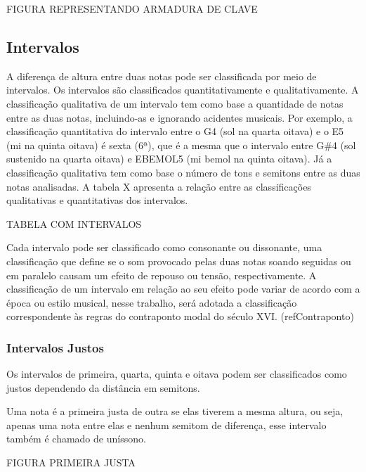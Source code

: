       FIGURA REPRESENTANDO ARMADURA DE CLAVE

    \subsection[Intervalos]{Intervalos}

      A diferença de altura entre duas notas pode ser classificada por meio de intervalos. Os intervalos são classificados quantitativamente e qualitativamente. A classificação qualitativa de um intervalo tem como base a quantidade de notas entre as duas notas, incluindo-as e ignorando acidentes musicais. Por exemplo, a classificação quantitativa do intervalo entre o G4 (sol na quarta oitava) e o E5 (mi na quinta oitava) é sexta (6ª), que é a mesma que o intervalo entre G\#4 (sol sustenido na quarta oitava) e EBEMOL5 (mi bemol na quinta oitava). Já a classificação qualitativa tem como base o número de tons e semitons entre as duas notas analisadas. A tabela X apresenta a relação entre as classificações qualitativas e quantitativas dos intervalos.

      TABELA COM INTERVALOS

      Cada intervalo pode ser classificado como consonante ou dissonante, uma classificação que define se o som provocado pelas duas notas soando seguidas ou em paralelo causam um efeito de repouso ou tensão, respectivamente. A classificação de um intervalo em relação ao seu efeito pode variar de acordo com a época ou estilo musical, nesse trabalho, será adotada a classificação correspondente às regras do contraponto modal do século XVI. (refContraponto)

      \subsubsection[Intervalos Justos]{Intervalos Justos}

        Os intervalos de primeira, quarta, quinta e oitava podem ser classificados como justos dependendo da distância em semitons.

        Uma nota é a primeira justa de outra se elas tiverem a mesma altura, ou seja, apenas uma nota entre elas e nenhum semitom de diferença, esse intervalo também é chamado de uníssono.

        FIGURA PRIMEIRA JUSTA

